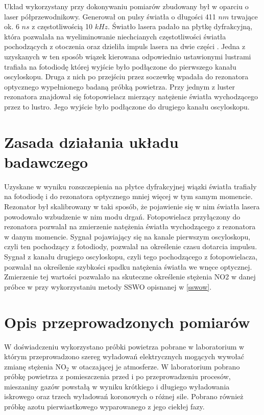 \documentclass[10pt,a4paper]{article}
\begin{document}
Układ wykorzystany przy dokonywaniu pomiarów zbudowany był w oparciu o laser półprzewodnikowy. Generował on pulsy światła o długości 411 $nm$ trwające ok. 6 $ns$ z częstotliwością 10 $kHz$. Światło lasera padało na płytkę dyfrakcyjną, która pozwalała na wyeliminowanie niechcianych częstotliwości światła pochodzących z otoczenia oraz dzieliła impuls lasera na dwie części \cite{sswo}. Jedna z uzyskanych w ten sposób wiązek kierowana odpowiednio ustawionymi lustrami trafiała na fotodiodę której wyjście było podłączone do pierwszego kanału oscyloskopu. Druga z nich po przejściu przez soczewkę wpadała do rezonatora optycznego wypełnionego badaną próbką powietrza. Przy jednym z luster rezonatora znajdował się fotopowielacz mierzący natężenie światła wychodzącego przez to lustro.  Jego wyjście było podłączone do drugiego kanału oscyloskopu.

\section{Zasada działania układu badawczego} 
Uzyskane w wyniku rozszczepienia na płytce dyfrakcyjnej wiązki światła trafiały na fotodiodę i do rezonatora optycznego mniej więcej w tym samym momencie. Rezonator był skalibrowany w taki sposób, że pojawienie się w nim światła lasera powodowało wzbudzenie w nim modu drgań. Fotopowielacz przyłączony do rezonatora pozwalał na zmierzenie natężenia światła wychodzącego z rezonatora w danym momencie. Sygnał pojawiający się na kanale pierwszym oscyloskopu, czyli ten pochodzący z fotodiody, pozwalał na określenie czasu dotarcia impulsu. Sygnał z kanału drugiego oscyloskopu, czyli tego pochodzącego z fotopowielacza, pozwalał na określenie szybkości spadku natężenia światła we wnęce optycznej. Zmierzenie tej wartości pozwalało na skuteczne określenie stężenia NO2 w danej próbce w przy wykorzystaniu metody SSWO opisnanej w \ref{sswow}.

\section{Opis przeprowadzonych pomiarów}
W doświadczeniu wykorzystano próbki powietrza pobrane w laboratorium w którym przeprowadzono szereg wyładowań elektrycznych mogących wywołać zmianę stężenia $\text{NO}_{\text{2}}$ w otaczającej je atmosferze. W laboratorium pobrano próbkę powietrza z pomieszczenia przed i po przeprowadzeniu procesów, mieszaniny gazów powstałą w wyniku krótkiego i długiego wyładowania iskrowego oraz  trzech wyładowań koronowych o różnej sile. Pobrano również próbkę azotu pierwiastkowego wyparowanego z jego ciekłej fazy. 
\end{document}
